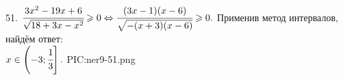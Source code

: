 51. $\cfrac{3x^2-19x+6}{\sqrt{18+3x-x^2}}\geqslant0\Leftrightarrow\cfrac{(3x-1)(x-6)}{\sqrt{-(x+3)(x-6)}}\geqslant0.$ Применив метод интервалов, найдём ответ:\\ $x\in\left(-3;\cfrac{1}{3}\right].$
{{PIC:ner9-51.png}}\newpage\noindent
